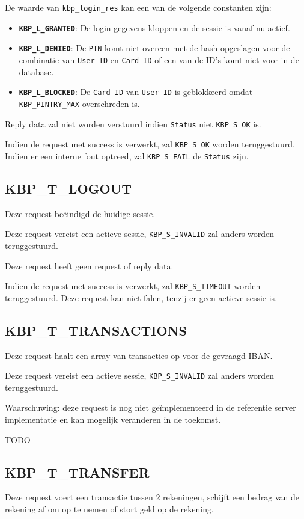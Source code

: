 \documentclass[11pt,a4paper]{article}
\begin{document}
De waarde van \texttt{kbp\_login\_res} kan een van de volgende constanten zijn:
\begin{itemize}
	\item \textbf{\texttt{KBP\_L\_GRANTED}}: De login gegevens kloppen en de
		sessie is vanaf nu actief.
	\item \textbf{\texttt{KBP\_L\_DENIED}}: De \texttt{PIN} komt niet
		overeen met de hash opgeslagen voor de combinatie van
		\texttt{User ID} en \texttt{Card ID} of een van de ID's komt
		niet voor in de database.
	\item \textbf{\texttt{KBP\_L\_BLOCKED}}: De \texttt{Card ID} van
		\texttt{User ID} is geblokkeerd omdat \texttt{KBP\_PINTRY\_MAX}
		overschreden is.
\end{itemize}

Reply data zal niet worden verstuurd indien \texttt{Status} niet
\texttt{KBP\_S\_OK} is.

Indien de request met success is verwerkt, zal \texttt{KBP\_S\_OK} worden
teruggestuurd. Indien er een interne fout optreed, zal \texttt{KBP\_S\_FAIL} de
\texttt{Status} zijn.

\subsection{KBP\_T\_LOGOUT}
Deze request beëindigd de huidige sessie.

Deze request vereist een actieve sessie, \texttt{KBP\_S\_INVALID} zal anders
worden teruggestuurd.

Deze request heeft geen request of reply data.

Indien de request met success is verwerkt, zal \texttt{KBP\_S\_TIMEOUT} worden
teruggestuurd. Deze request kan niet falen, tenzij er geen actieve sessie is.

\subsection{KBP\_T\_TRANSACTIONS}
Deze request haalt een array van transacties op voor de gevraagd IBAN.

Deze request vereist een actieve sessie, \texttt{KBP\_S\_INVALID} zal anders
worden teruggestuurd.

Waarschuwing: deze request is nog niet geïmplementeerd in de referentie server
implementatie en kan mogelijk veranderen in de toekomst.

TODO

\subsection{KBP\_T\_TRANSFER}
Deze request voert een transactie tussen 2 rekeningen, schijft een bedrag van de
rekening af om op te nemen of stort geld op de rekening.
\end{document}
